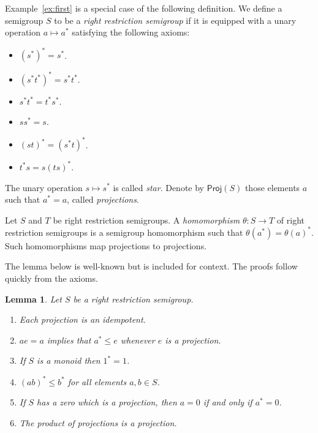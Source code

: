 \documentclass[a4paper]{amsart}
\newtheorem{lemma}[theorem]{Lemma}
\begin{document}
Example~\ref{ex:first} is a special case of the following definition.
We define a semigroup $S$ to be a {\em right restriction semigroup} if
it is equipped with a unary operation $a \mapsto a^{\ast}$ satisfying the following axioms:
\begin{itemize}
\item[{\rm (RR1).}] $(s^{\ast})^{\ast} = s^{\ast}$. 
\item[{\rm (RR2).}] $(s^{\ast}t^{\ast})^{\ast} = s^{\ast}t^{\ast}$.
\item[{\rm (RR3).}] $s^{\ast}t^{\ast} = t^{\ast}s^{\ast}$.
\item[{\rm (RR4).}] $ss^{\ast} = s$.
\item[{\rm (RR5).}] $(st)^{\ast} = (s^{\ast}t)^{\ast}$.
\item[{\rm (RR6).}] $t^{\ast}s = s(ts)^{\ast}$.
\end{itemize}
The unary operation $s \mapsto s^{\ast}$ is called {\em star}.
Denote by $\mathsf{Proj}(S)$ those elements $a$ such that $a^{\ast} = a$, called {\em projections}.

Let $S$ and $T$ be right restriction semigroups.
A {\em homomorphism} $\theta \colon S \rightarrow T$ of right restriction semigroups
is a semigroup homomorphism such that $\theta (a^{\ast}) = \theta (a)^{\ast}$.
Such homomorphisms map projections to projections.

The lemma below is well-known but is included for context.
The proofs follow quickly from the axioms.

\begin{lemma}\label{lem:one} Let $S$ be a right restriction semigroup.
\begin{enumerate}
\item Each projection is an idempotent.
\item $ae = a$ implies that $a^{\ast} \leq e$ whenever $e$ is a projection.
\item If $S$ is a monoid then $1^{\ast} = 1$.
\item $(ab)^{\ast} \leq b^{\ast}$ for all elements $a,b \in S$.
\item If $S$ has a zero which is a projection, then $a = 0$ if and only if $a^{\ast} = 0$.
\item The product of projections is a projection.
\end{enumerate}
\end{lemma}
\end{document}
